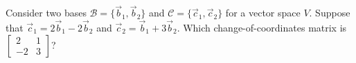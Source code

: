 \documentclass{ximera}
\begin{document}
  	  		      \begin{question} Consider two bases $\mathcal{B} =\{\vec{b}_1,\vec{b}_2\}$ and $\mathcal{C} =\{\vec{c}_1,\vec{c}_2\}$ for a vector space $V$. Suppose that $\vec{c}_1 = 2\vec{b}_1-2\vec{b}_2$ and $\vec{c}_2 = \vec{b}_1+3\vec{b}_2$. Which change-of-coordinates matrix is $\begin{bmatrix} 2&1\\ -2&3 \end{bmatrix}$?\\
  	  		      		\begin{multipleChoice}
  	  		      			\end{multipleChoice}
  	  		      
  	  
  	  		      	\end{question}
\end{document}

